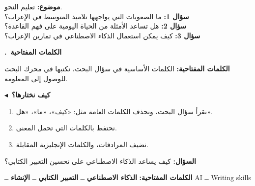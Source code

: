 \documentclass[a4paper]{article}
\newcounter{qism}
\newcommand{\qism}[1]{%
    \stepcounter{qism}%
    \par\bigskip
    {\large\khatt\bfseries{\color{asasi}\arabic{qism}.}\ {\color{dakin}#1}}\par
    \vspace{-2pt}{\color{black!20}\rule{\linewidth}{0.6pt}}\par\nopagebreak[4]
    \smallskip}
\newcommand{\far}[1]{\par\smallskip
    {\color{dakin}\khatt\bfseries {\color{asasi}$\blacktriangleleft$}\ #1}\par\nopagebreak[4]}
\newcommand{\kalima}[2][]{\textbf{#2}}
\begin{document}
\begin{center}
\end{center}

\begin{arabiyya}
\textbf{موضوع:} تعليم النحو.\\
\textbf{سؤال 1:} ما الصعوبات التي يواجهها تلاميذ المتوسط في الإعراب؟\\
\textbf{سؤال 2:} هل تساعد الأمثلة من الحياة اليومية على فهم القاعدة؟\\
\textbf{سؤال 3:} كيف يمكن استعمال الذكاء الاصطناعي في تمارين الإعراب؟
\end{arabiyya}

\qism{الكلمات المفتاحية}

\begin{taarif}
\textbf{الكلمات المفتاحية:} الكلمات الأساسية في سؤال البحث،
نكتبها في محرك البحث للوصول إلى المعلومة.
\end{taarif}

\far{كيف نختارها؟}
\begin{enumerate}
    \item نقرأ سؤال البحث، ونحذف الكلمات العامة مثل: «كيف»، «ما»، «هل».
    \item نحتفظ بالكلمات التي تحمل المعنى.
    \item نضيف المرادفات، والكلمات الإنجليزية المقابلة.
\end{enumerate}

\begin{mithal}
\textbf{السؤال:} كيف يساعد الذكاء الاصطناعي على تحسين التعبير الكتابي؟

\textbf{الكلمات المفتاحية:}
\kalima{الذكاء الاصطناعي} ــ \kalima{التعبير الكتابي} ــ \kalima{الإنشاء} ــ
\textenglish{AI} ــ \textenglish{Writing skills}
\end{mithal}
\end{document}
